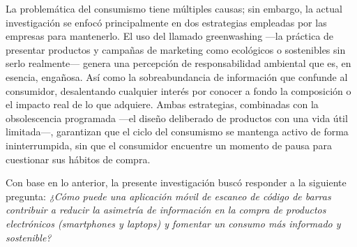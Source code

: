 La problemática del consumismo tiene múltiples causas; sin embargo, la actual
investigación se enfocó principalmente en dos estrategias empleadas por
las empresas para mantenerlo. El uso del llamado greenwashing —la práctica de
presentar productos y campañas de marketing como ecológicos o sostenibles sin
serlo realmente— genera una percepción de responsabilidad ambiental que es, en
esencia, engañosa. Así como la sobreabundancia de información que confunde al
consumidor, desalentando cualquier interés por conocer a fondo la composición o
el impacto real de lo que adquiere. Ambas estrategias, combinadas con la
obsolescencia programada —el diseño deliberado de productos con una vida útil
limitada—, garantizan que el ciclo del consumismo se mantenga activo de forma
ininterrumpida, sin que el consumidor encuentre un momento de pausa para
cuestionar sus hábitos de compra. 

Con base en lo anterior, la presente investigación buscó responder a la
siguiente pregunta: \noindent\textit{¿Cómo puede una aplicación móvil de escaneo
de código de barras contribuir a reducir la asimetría de información en la
compra de productos electrónicos (smartphones y laptops) y fomentar un consumo
más informado y sostenible?}